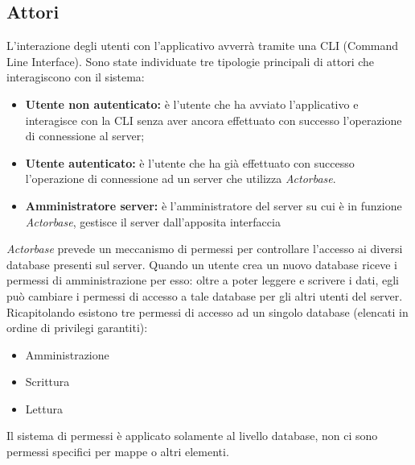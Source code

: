 \documentclass[a4paper]{article}
\begin{document}
		\subsection{Attori}
		L'interazione degli utenti con l'applicativo avverrà tramite una CLI (Command Line Interface).
		Sono state individuate tre tipologie principali di attori che interagiscono con il sistema:
		\begin{itemize}
			\item \textbf{Utente non autenticato:} è l'utente che ha avviato l'applicativo e interagisce con la CLI senza aver ancora effettuato con successo l'operazione di connessione al server;
			\item \textbf{Utente autenticato:} è l'utente che ha già effettuato con successo l'operazione di connessione ad un server che utilizza \emph{Actorbase}. 
			\item \textbf{Amministratore server:} è l'amministratore del server su cui è in funzione \emph{Actorbase}, gestisce il server dall'apposita interfaccia
		\end{itemize}
		\emph{Actorbase} prevede un meccanismo di permessi per controllare l'accesso ai diversi database presenti sul server. Quando un utente crea un nuovo database riceve i permessi di amministrazione per esso: oltre a poter leggere e scrivere i dati, egli può cambiare i permessi di accesso a tale database per gli altri utenti del server. \\ 
		Ricapitolando esistono tre permessi di accesso ad un singolo database (elencati in ordine di privilegi garantiti):
		\begin{itemize}
		\item Amministrazione
		\item Scrittura
		\item Lettura
		\end{itemize}
		Il sistema di permessi è applicato solamente al livello database, non ci sono permessi specifici per mappe o altri elementi.
\end{document}
